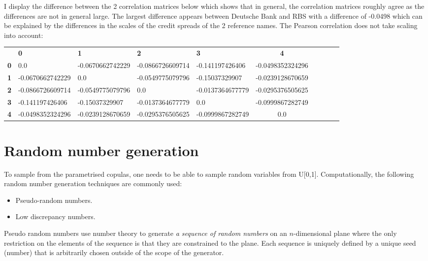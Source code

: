 \documentclass{report}
\theoremstyle{plain}
\theoremstyle{definition}
\begin{document}
I display the difference between the 2 correlation matrices below which shows that in general, the correlation matrices roughly agree as the differences are not in general large. The  largest difference appears between Deutsche Bank and RBS with a difference of -0.0498 which can be explained by the differences in the scales of the credit spreads of the 2 reference names. The Pearson correlation does not take scaling into account:

\begin{center}
	\begin{tabular}{|l|l|l|l|l|c|c|c|c|c|}
		\hline
		& \textbf{0} & \textbf{1} & \textbf{2} & \textbf{3} & \textbf{4}\\\hhline{|=|=|=|=|=|=|}
		\textbf{0} & 0.0 & -0.0670662742229 & -0.0866726609714 & -0.141197426406 & -0.0498352324296\\
		\textbf{1} & -0.0670662742229 & 0.0 & -0.0549775079796 & -0.15037329907 & -0.0239128670659\\
		\textbf{2} & -0.0866726609714 & -0.0549775079796 & 0.0 & -0.0137364677779 & -0.0295376505625\\
		\textbf{3} & -0.141197426406 & -0.15037329907 & -0.0137364677779 & 0.0 & -0.0999867282749\\
		\textbf{4} & -0.0498352324296 & -0.0239128670659 & -0.0295376505625 & -0.0999867282749 & 0.0\\
		\hline
	\end{tabular}
\end{center}

\section{Random number generation}

To sample from the parametrised copulas, one needs to be able to sample random variables from U[0,1]. Computationally, the following random number generation techniques are commonly used:
\begin{itemize}
	\item Pseudo-random numbers.
	\item Low discrepancy numbers.
\end{itemize}

Pseudo random numbers use number theory to generate \emph{a sequence of random numbers} on an $n$-dimensional plane where the only restriction on the elements of the sequence is that they are constrained to the plane. Each sequence is uniquely defined by a unique seed (number) that is arbitrarily chosen outside of the scope of the generator.\\
\end{document}
